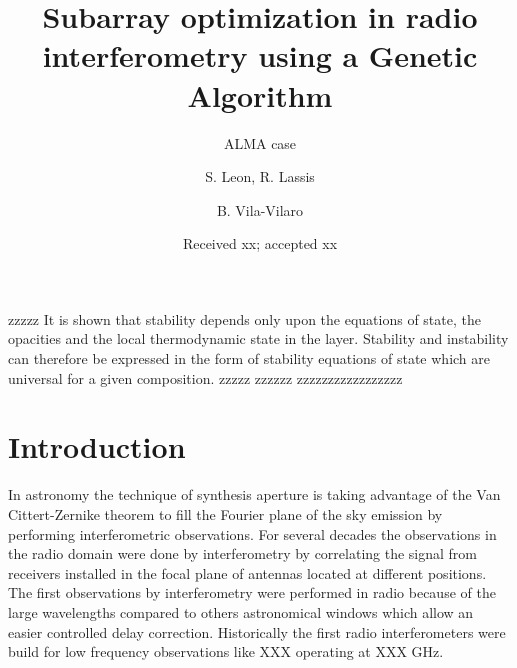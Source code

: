 \documentclass{aa}
\begin{document}
 


   \title{Subarray optimization in radio interferometry using a Genetic Algorithm}

   \subtitle{ALMA case}

   \author{S. Leon, R. Lassis
          \and
          B. Vila-Vilaro
          }


   \date{Received xx; accepted xx}

 
  \abstract
  {zzzzz}
   {It is shown that stability
   depends only upon the equations of state, the opacities and the local
   thermodynamic state in the layer. Stability and instability can
   therefore be expressed in the form of stability equations of state
   which are universal for a given composition.}
   {zzzzz}
   {zzzzzz}
   {zzzzzzzzzzzzzzzzz}


   \maketitle
%

\section{Introduction}

In astronomy the technique of synthesis aperture is taking advantage of the Van Cittert-Zernike theorem to fill the Fourier plane of the sky emission  by
performing interferometric observations. For several decades the observations in the radio domain were done by interferometry  by correlating the signal from 
receivers installed in the focal plane of antennas located at different positions. The first observations by interferometry were performed in radio because of the 
large wavelengths compared to others astronomical windows which allow an easier controlled delay correction. Historically the first radio interferometers were build for 
low frequency observations like XXX  operating at XXX GHz. 
\end{document}
